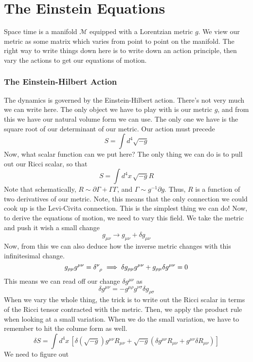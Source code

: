 \pagebreak
\section{The Einstein Equations} 
Space time is a manifold $\mathcal{ M } $ equipped 
with a Lorentzian metric $ g$. We view 
our metric as some matrix which varies from 
point to point on the manifold. The right way 
to write things down here is to write down an 
action principle, then vary the actions to get our 
equations of motion. 

\subsubsection{The Einstein-Hilbert Action} 
The dynamics is governed by the Einstein-Hilbert 
action. 
There's not very much we can write here. 
The only object we have to play with is our metric  $ g $, 
and from this we have our natural volume form we can use. 
The only one we have is the square root of our determinant 
of our metric. Our action must precede 
\[
 S = \int d^ 4 \sqrt{ - g }  
\] Now, what scalar function can we put here? 
The only thing we can do is to pull out our Ricci scalar, 
so that 
\[
 S = \int d^ 4 x \, \sqrt{  - g }  R 
\] Note that schematically, $ R \sim \partial  \Gamma + \Gamma  \Gamma $, 
and $ \Gamma \sim g ^{ - 1} \partial  g $. 
Thus, $ R $ is a function of two derivatives 
of our metric. Note, this 
means that the only connection we 
could cook up is the Levi-Civita connection. This is the simplest thing we can do!
Now, to derive the equations of motion, we need to vary this field. 
We take the metric and push it wish a small change 
\[
 g _{\mu \nu  } \to g _{ \mu \nu } + \delta g _{ \mu \nu }
\] Now, from this we can also deduce how 
the inverse metric changes with this infinitesimal change. 
\[
 g_{ \rho \mu } g ^{ \mu \nu } = \delta \indices{ ^ \nu _ \rho } \implies 
 \delta g_{ \rho \mu } g ^{ \mu \nu } + g _{ \rho \mu  } \delta g ^{ \mu \nu } = 0 
\]  This means 
we can read off our change $ \delta g ^{ \mu \nu }  $ as 
\[
 \delta g ^{ \mu \nu }  =  - g ^{ \mu \rho } g ^{ \nu \sigma } \delta g_{ \rho \sigma}
\] When we vary the whole thing, 
the trick is to write out the Ricci 
scalar in terms of the Ricci tensor 
contracted with the metric. Then, we 
apply the product rule when looking at a small variation.
When we do the small variation, we have to remember 
to hit the colume form as well. 
\[
 \delta S  = \int d ^4  x \, 
 \left[  \delta ( \sqrt{  - g } ) g ^{ \mu \nu } R _{ \mu \nu } + 
 \sqrt{ - g }  \left(  \delta g ^{ \mu \nu } R_{ \mu \nu } + g^{ \mu \nu } \delta R _{ \mu \nu } \right) \right] 
\] We need to figure out 
